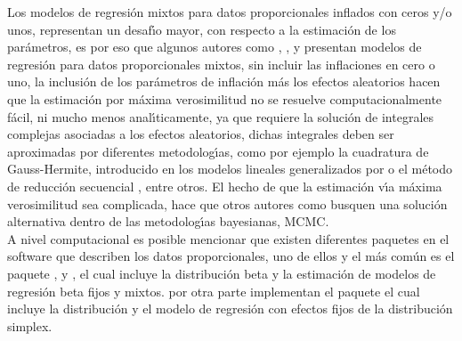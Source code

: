 Los modelos de regresi\'{o}n mixtos para datos proporcionales inflados con ceros y/o unos, re\-pre\-sen\-tan un desaf\'{\i}o mayor, con respecto a la estimaci\'{o}n de los par\'{a}metros, es por eso que algunos autores como \cite{Usuga1}, \cite{Bonat2}, \cite{Song1} y \cite{Stasinopoulos2} presentan modelos de regresi\'{o}n para datos proporcionales mixtos, sin incluir las inflaciones en cero o uno, la inclusi\'{o}n de los par\'{a}metros de inflaci\'{o}n m\'{a}s los efectos aleatorios hacen que la estimaci\'{o}n por m\'{a}xima verosimilitud no se resuelve computacionalmente f\'{a}cil, ni mucho menos anal\'{\i}ticamente, ya que requiere la soluci\'{o}n de integrales complejas asociadas a los efectos aleatorios, dichas integrales deben ser aproximadas por diferentes metodolog\'{\i}as, como por ejemplo la cuadratura de Gauss-Hermite, introducido en los modelos lineales generalizados por \cite{Fahrmeir1} o el m\'{e}todo de reducci\'{o}n secuencial \citep{Ogden1}, entre otros. El hecho de que la estimaci\'{o}n v\'{\i}a m\'{a}xima verosimilitud sea complicada, hace que otros autores como \cite{Galvis1} busquen una soluci\'{o}n alternativa dentro de las metodolog\'{\i}as bayesianas, MCMC.\\

A nivel computacional es posible mencionar que existen diferentes paquetes en el software  que describen los datos proporcionales, uno de ellos y el m\'{a}s com\'{u}n es el paquete  \citep{Zeileis1}, \citep{Ferrari1} y \citep{Simas1}, el cual incluye la distribuci\'{o}n beta y la estimaci\'{o}n de modelos de regresi\'{o}n beta fijos y mixtos. por otra parte \cite{Qiu1} implementan el paquete  el cual incluye la distribuci\'{o}n y el modelo de regresi\'{o}n con efectos fijos de la distribuci\'{o}n simplex.\\

